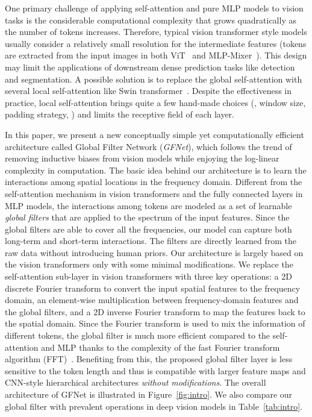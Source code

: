 \documentclass{article}
\numberwithin{equation}{section}
\newcommand{\gknet}{GFNet}
\begin{document}
One primary challenge of applying self-attention and pure MLP models to vision tasks is the considerable computational complexity that grows quadratically as the number of tokens increases. Therefore, typical vision transformer style models usually consider a relatively small resolution for the intermediate features (\eg  tokens are extracted from the input images in both ViT~\cite{dosovitskiy2020vit} and MLP-Mixer~\cite{tolstikhin2021mlp}). This design may limit the applications of downstream dense prediction tasks like detection and segmentation. A possible solution is to replace the global self-attention with several local self-attention like Swin transformer~\cite{liu2021swin}. Despite the effectiveness in practice, local self-attention brings quite a few hand-made choices (\eg, window size, padding strategy, \etc) and limits the receptive field of each layer. 

In this paper, we present a new conceptually simple yet computationally efficient architecture called Global Filter Network (\emph{\gknet}), which follows the trend of removing inductive biases from vision models while enjoying the log-linear complexity in computation. The basic idea behind our architecture is to learn the interactions among spatial locations in the frequency domain. Different from the self-attention mechanism in vision transformers and the fully connected layers in MLP models, the interactions among tokens are modeled as a set of learnable \emph{global filters} that are applied to the spectrum of the input features. Since the global filters are able to cover all the frequencies, our model can capture both long-term and short-term interactions. The filters are directly learned from the raw data without introducing human priors. Our architecture is largely based on the vision transformers only with some minimal modifications. We replace the self-attention sub-layer in vision transformers with three key operations: a 2D discrete Fourier transform to convert the input spatial features to the frequency domain, an element-wise multiplication between frequency-domain features and the global filters, and a 2D inverse Fourier transform to map the features back to the spatial domain. Since the Fourier transform is used to mix the information of different tokens, the global filter is much more efficient compared to the self-attention and MLP thanks to the  complexity of the fast Fourier transform algorithm (FFT)~\cite{cooley1965algorithmfft}. Benefiting from this, the proposed global filter layer is less sensitive to the token length  and thus is compatible with larger feature maps and CNN-style hierarchical architectures \emph{without modifications}. The overall architecture of {\gknet} is illustrated in Figure~\ref{fig:intro}. We also compare our global filter with prevalent operations in deep vision models in Table~\ref{tab:intro}.   
\end{document}
